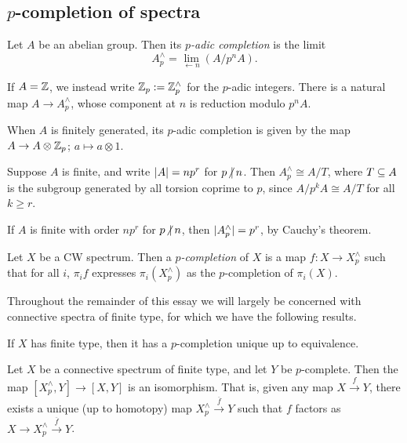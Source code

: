 \documentclass{MetricNotes2023}
\def\subq{\ensuremath\subseteq}
\def\inte{\ensuremath\mathbb{Z}}
\def\nvert{\ensuremath\hspace{-0.5ex}\not\vert\hspace{0.5ex}}
\begin{document}
\subsection{\(p\)-completion of spectra}\label{2504291246}

\begin{definition}
Let \(A\) be an abelian group. Then its \textit{\(p\)-adic completion} is the limit 
\[A^\wedge_p=\lim\limits_{\leftarrow n} (A/p^nA).\]
\end{definition}

If \(A=\inte\), we instead write \(\inte_p := \inte_p^\wedge\) for the \(p\)-adic integers. There is a natural map \(A \to A^\wedge_p\), whose component at \(n\) is reduction modulo \(p^nA\). 

When \(A\) is finitely generated, its \(p\)-adic completion is given by the map \(A \to A\otimes \inte_p\); \(a\mapsto a\otimes 1\). 

\begin{remark}%
Suppose \(A\) is finite, and write \(\lvert A\rvert=np^r\) for \(p\nvert n\). Then \(A^\wedge_p\cong A/T\), where \(T\subq A\) is the subgroup generated by all torsion coprime to \(p\), since \(A/p^kA\cong A/T\) for all \(k\geq r\).
\end{remark}

\begin{remark}
If \(A\) is finite with order \(np^r\) for \(p\nvert n\), then \(\lvert A^\wedge_p\rvert=p^r\), by Cauchy's theorem. 
\end{remark}

\begin{definition}
Let \(X\) be a CW spectrum. Then a \textit{\(p\)-completion} of \(X\) is a map \(f : X \to X^\wedge_p\) such that for all \(i\), \(\pi_if\) expresses \(\pi_i(X^\wedge_p)\) as the \(p\)-completion of \(\pi_i(X)\).
\end{definition}

Throughout the remainder of this essay we will largely be concerned with connective spectra of finite type, for which we have the following results.

\begin{theorem}
If \(X\) has finite type, then it has a \(p\)-completion unique up to equivalence. 
\end{theorem}

\begin{theorem}\label{2504180925}
Let \(X\) be a connective spectrum of finite type, and let \(Y\) be \(p\)-complete. Then the map \([X^\wedge_p, Y]\to [X, Y]\) is an isomorphism. That is, given any map \(X \xrightarrow{f} Y\), there exists a unique (up to homotopy) map \(X^\wedge_p \xrightarrow{\overline f} Y\) such that \(f\) factors as \(X \to X^\wedge_p \xrightarrow{\overline f} Y\). 
\end{theorem}
\end{document}
